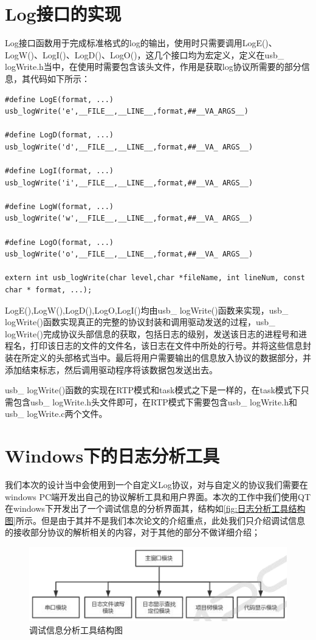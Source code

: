\section{Log接口的实现}
	Log接口函数用于完成标准格式的log的输出，使用时只需要调用LogE()、LogW()、LogI()、LogD()、LogO()，这几个接口均为宏定义，定义在usb\_ logWrite.h当中，在使用时需要包含该头文件，作用是获取log协议所需要的部分信息，其代码如下所示：
\lstset{language=C}
\begin{lstlisting}
#define LogE(format, ...) usb_logWrite('e',__FILE__,__LINE__,format,##__VA_ARGS__)

#define LogD(format, ...) usb_logWrite('d',__FILE__,__LINE__,format,##__VA_ ARGS__)

#define LogI(format, ...) usb_logWrite('i',__FILE__,__LINE__,format,##__VA_ ARGS__)

#define LogW(format, ...) usb_logWrite('w',__FILE__,__LINE__,format,##__VA_ ARGS__)

#define LogO(format, ...) usb_logWrite('o',__FILE__,__LINE__,format,##__VA_ ARGS__)

extern int usb_logWrite(char level,char *fileName, int lineNum, const char * format, ...);
\end{lstlisting}
LogE(),LogW(),LogD(),LogO,LogI()均由usb\_ logWrite()函数来实现，usb\_ logWrite()函数实现真正的完整的协议封装和调用驱动发送的过程，usb\_ logWrite()完成协议头部信息的获取，包括日志的级别，发送该日志的进程号和进程名，打印该日志的文件的文件名，该日志在文件中所处的行号。并将这些信息封装在所定义的头部格式当中。最后将用户需要输出的信息放入协议的数据部分，并添加结束标志，然后调用驱动程序将该数据包发送出去。


usb\_ logWrite()函数的实现在RTP模式和task模式之下是一样的，在task模式下只需包含usb\_ logWrite.h头文件即可，在RTP模式下需要包含usb\_ logWrite.h和usb\_ logWrite.c两个文件。


\section{Windows下的日志分析工具}
	
	我们本次的设计当中会使用到一个自定义Log协议，对与自定义的协议我们需要在windows PC端开发出自己的协议解析工具和用户界面。本次的工作中我们使用QT在windows下开发出了一个调试信息的分析界面其，结构如\autoref{fig:日志分析工具结构图}所示。但是由于其并不是我们本次论文的介绍重点，此处我们只介绍调试信息的接收部分协议的解析相关的内容，对于其他的部分不做详细介绍；
\begin{figure}[!h]
\centering
\includegraphics[width=1.0\textwidth]{./graphics/routonLog-system-structure.pdf}
\caption{调试信息分析工具结构图}\label{fig:日志分析工具结构图}
\end{figure}

